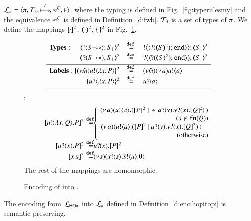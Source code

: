 \smallskip 

\begin{definition}
\label{d:enc:hopitopi}
$\tyl{L}_{\sessp}=\calc{\sessp}{{\cal{T}}_3}{\hby{\ell}}{\fwb}{\proves}$. 
where the typing is defined in 
Fig.~\ref{fig:typerulesmy} 
and the equivalence $\approx^C$ is defined in Definition~\ref{d:fwb}.
${\cal{T}}_3$ is a set of types of $\pi$.  
%
We define the mappings $[\!\![\cdot]\!\!]^{2}$, $(\!\!\langle\cdot\rangle\!\!)^{2}$, $\{\!\!\{\cdot\}\!\!\}^{2}$
in Fig.~\ref{f:enc:ho_to_sessp}. 
\end{definition}

\smallskip 

\begin{figure}[t]
\[
\begin{array}{l}
	\begin{array}{rcl}
\noindent{\bf Types:}\hspace{0.5cm} 
		\tmap{\btout{\lhot{S}}S_1}{2} & \defeq & \bbtout{\chtype{\btinp{\tmap{S}{2}}\tinact}}\tmap{S_1}{2} \\
		\tmap{\btinp{\lhot{S}}S_1}{2} & \defeq & \bbtinp{\chtype{\btinp{\tmap{S}{2}}\tinact}}\tmap{S_1}{2} 
\\[1mm]
\hline
\noindent{\bf Labels:}\ 
		\mapa{(\nu \tilde{m})\bactout{u}{\abs{ x}{P}} }^2  & \defeq & (\nu \tilde{m})\news{a} \bactout{u}{a} \\
		\mapa{\bactinp{u}{\abs{ x}{P}} }^2 &  \defeq & \bactinp{u}{a}
\\[1mm]
\hline
\end{array}
\end{array}
\]
\hspace{4mm}{\bf Terms} :
\[
\begin{array}{rcll}
		\pmap{\bout{u}{\abs{x}{Q}} P}{2} &\!\!\!\! \defeq \!\!\!\!\!\!\!\!&  \left\{
		\begin{array}{r}
			\newsp{a}{\bout{u}{a} (\pmap{P}{2} \Par \repl{} \binp{a}{y} \binp{y}{x} \pmap{Q}{2})\,}\\
                  (s \notin \fn{Q}) \\
			\newsp{a}{\bout{u}{a} (\pmap{P}{2} \Par \binp{a}{y} \binp{y}{x} \pmap{Q}{2})\,}\quad\\
            \textrm{(otherwise)} %
		\end{array}
		\right.
		\\
\pmap{\binp{u}{x} P}{2} &\!\!\!\! \defeq \!\!\!\! \!\!\!\! &  \binp{u}{x} \pmap{P}{2}\\
\pmap{\appl{x}{u}}{2} & \!\!\!\! \defeq \!\!\!\! \!\!\!\! & \newsp{s}{\bout{x}{s} \bout{\dual{s}}{u} \inact}\\

	\end{array}
	\]
The rest of the mappings are homomorphic. %
	\caption{
Encoding of \HOp into \sessp.
\label{f:enc:ho_to_sessp}
}
\Hline
\end{figure}

\begin{theorem}
\label{f:enc:hotopi}
The encoding from $\mathcal{L}_{\mathsf{HO}\pi}$ into $\mathcal{L}_{\pi}$ defined in 
Definition~\ref{d:enc:hopitopi} 
is semantic preserving. 
\end{theorem}





